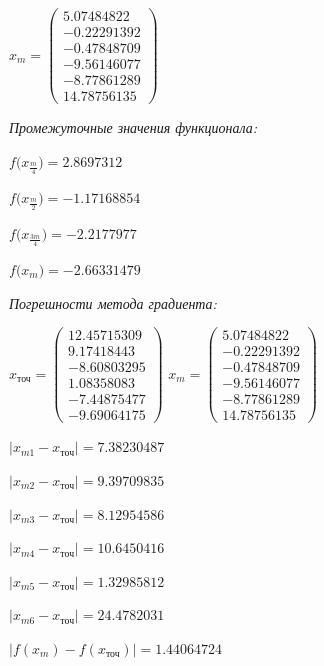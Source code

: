 \documentclass[a4paper, 14pt]{extarticle}
\begin{document}
	 $x_{m} = \begin{pmatrix}
	 	5.07484822\\
	 	-0.22291392\\
	 	-0.47848709\\
	 	-9.56146077\\
	 	-8.77861289\\
	 	14.78756135
	 \end{pmatrix} $
	\pagebreak
	
 	\textit{Промежуточные значения функционала:}
 	
 		$f\big(x_{\frac{m}{4}}\big) = 2.8697312$
 		
 		$f\big(x_{\frac{m}{2}}\big) = -1.17168854$
 		
 		$f\big(x_{\frac{3m}{4}}\big) = -2.2177977$
 		
 		$f\big(x_m) = -2.66331479$
 		
 	\textit{Погрешности метода градиента:}
 	
 	$x_{\text{точ}} = \begin{pmatrix}
			12.45715309\\
			9.17418443\\
			-8.60803295\\
			1.08358083\\
			-7.44875477\\
			-9.69064175
		\end{pmatrix}$
	$x_{m} = \begin{pmatrix}
		5.07484822\\
		-0.22291392\\
		-0.47848709\\
		-9.56146077\\
		-8.77861289\\
		14.78756135
	\end{pmatrix}$
	
 	$|x_{m1} - x_{\text{точ}}| = 7.38230487$
 	
 	$|x_{m2} - x_{\text{точ}}| = 9.39709835$
 	
 	$|x_{m3} - x_{\text{точ}}| = 8.12954586$
 	
 	$|x_{m4} - x_{\text{точ}}| = 10.6450416$
 	
 	$|x_{m5} - x_{\text{точ}}| = 1.32985812$
 	
 	$|x_{m6} - x_{\text{точ}}| = 24.4782031$
 	
 	$|f(x_m) - f(x_{\text{точ}})| = 1.44064724$
 	
\end{document}
